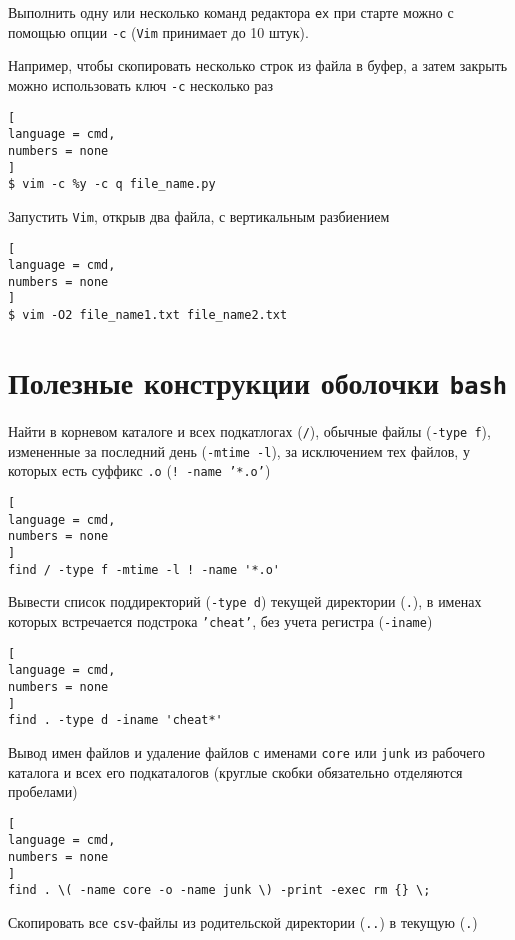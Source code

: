 \documentclass[%
	11pt,
	a4paper,
	utf8,
		]{article}
\begin{document}
Выполнить одну или несколько команд редактора \texttt{ex} при старте можно с помощью опции \verb|-c| (\texttt{Vim} принимает до 10 штук). 

Например, чтобы скопировать несколько строк из файла в буфер, а затем закрыть можно использовать ключ \verb|-c| несколько раз
\begin{lstlisting}[
language = cmd,
numbers = none
]
$ vim -c %y -c q file_name.py
\end{lstlisting}

Запустить \texttt{Vim}, открыв два файла, с вертикальным разбиением
\begin{lstlisting}[
language = cmd,
numbers = none
]
$ vim -O2 file_name1.txt file_name2.txt
\end{lstlisting}


\section{Полезные конструкции оболочки \texttt{bash}}

Найти в корневом каталоге и всех подкатлогах (\texttt{/}), обычные файлы (\texttt{-type f}), измененные за последний день (\texttt{-mtime -l}), за исключением тех файлов, у которых есть суффикс \texttt{.o} (\texttt{! -name '*.o'})

\begin{lstlisting}[
language = cmd,
numbers = none
]
find / -type f -mtime -l ! -name '*.o'
\end{lstlisting}

Вывести список поддиректорий (\texttt{-type d}) текущей директории (\texttt{.}), в именах которых встречается подстрока \texttt{'cheat'}, без учета регистра (\texttt{-iname})

\begin{lstlisting}[
language = cmd,
numbers = none
]
find . -type d -iname 'cheat*'
\end{lstlisting}

Вывод имен файлов и удаление файлов с именами \texttt{core} или \texttt{junk} из рабочего каталога и всех его подкаталогов (круглые скобки обязательно отделяются пробелами)

\begin{lstlisting}[
language = cmd,
numbers = none
]
find . \( -name core -o -name junk \) -print -exec rm {} \;
\end{lstlisting}

Скопировать все \texttt{csv}-файлы из родительской директории (\texttt{..}) в текущую (\texttt{.})
\end{document}
